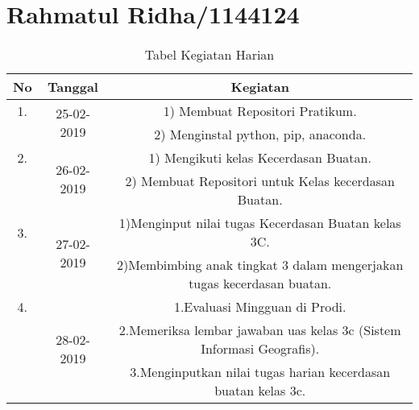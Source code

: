 \chapter{Rahmatul Ridha/1144124}

\begin{table}[h]
\caption{Tabel Kegiatan Harian}
\centering
\begin{tabular}{|c|c|c|}
\hline
No&Tanggal&Kegiatan\\
\hline
1.&\multirow{2}{*}{25-02-2019}&1) Membuat Repositori Pratikum.\\
&&2) Menginstal python, pip, anaconda.\\
\hline
2.&\multirow{2}{*}{26-02-2019}&1) Mengikuti kelas Kecerdasan Buatan.\\
&&2) Membuat Repositori untuk Kelas kecerdasan Buatan.\\
\hline
3.&\multirow{2}{*}{27-02-2019}&1)Menginput nilai tugas Kecerdasan Buatan kelas 3C.\\
&&2)Membimbing anak tingkat 3 dalam mengerjakan tugas kecerdasan buatan.\\
\hline
4.&\multirow{3}{*}{28-02-2019}&1.Evaluasi Mingguan di Prodi.\\
&&2.Memeriksa lembar jawaban uas kelas 3c (Sistem Informasi Geografis).\\
&&3.Menginputkan nilai tugas harian kecerdasan buatan kelas 3c.\\
\hline
\end{tabular}
\label{table:contoh}
\end{table}
